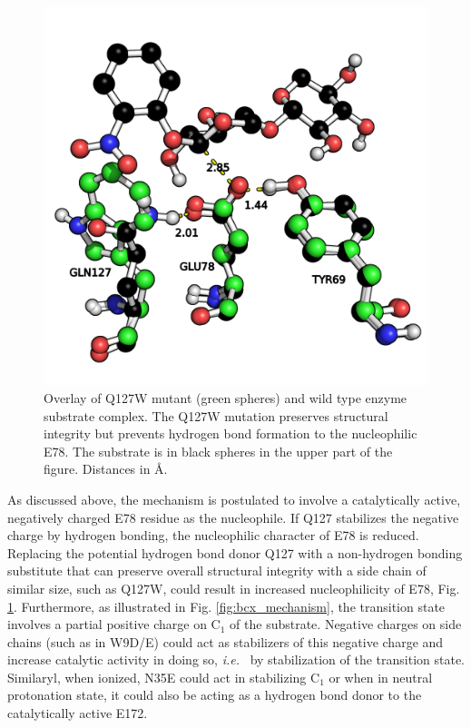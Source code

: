 \begin{figure}[htbp] 
\centering
\includegraphics[width=0.69\linewidth]{hbonds-es-wt-q127.png}
\caption{
Overlay of Q127W mutant (green spheres) and wild type enzyme substrate complex.
The Q127W mutation preserves structural integrity but prevents hydrogen bond formation to the nucleophilic E78.
The substrate is in black spheres in the upper part of the figure.
Distances in \AA\cite{hediger2013computational}.
}
\label{fig:bcx_rationalization}
\end{figure}
As discussed above, the mechanism is postulated to involve a catalytically active, negatively charged E78 residue as the nucleophile.
If Q127 stabilizes the negative charge by hydrogen bonding, the nucleophilic character of E78 is reduced.
Replacing the potential hydrogen bond donor Q127 with a non-hydrogen bonding substitute that can preserve overall structural integrity with a side chain of similar size, such as Q127W, could result in increased nucleophilicity of E78, Fig. \ref{fig:bcx_rationalization}.
Furthermore, as illustrated in Fig. \ref{fig:bcx_mechanism}, the transition state involves a partial positive charge on C$_1$ of the substrate.
Negative charges on side chains (such as in W9D/E) could act as stabilizers of this negative charge and increase catalytic activity in doing so, \textit{i.e. } by stabilization of the transition state.
Similaryl, when ionized, N35E could act in stabilizing C$_1$ or when in neutral protonation state, it could also be acting as a hydrogen bond donor to the catalytically active E172.
